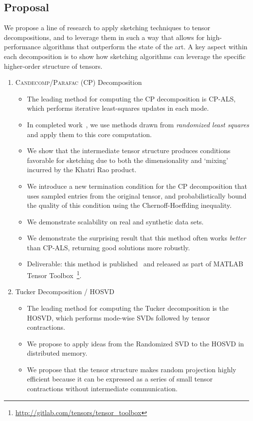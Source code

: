 \subsection{Proposal}
We propose a line of research to apply sketching techniques to tensor decompositions, and to leverage them in such a way that allows for high-performance algorithms that outperform the state of the art. A key aspect within each decomposition is to show how sketching algorithms can leverage the specific higher-order structure of tensors.
\begin{enumerate}
\item \textsc{Candecomp/Parafac} (CP) Decomposition
\begin{itemize}
	\item The leading method for computing the CP decomposition is CP-ALS, which performs iterative least-squares updates in each mode.
	\item In completed work~\cite{caseyb}, we use methods drawn from \emph{randomized least squares} and apply them to this core computation.
	\item We show that the intermediate tensor structure produces conditions favorable for sketching due to both the dimensionality and `mixing' incurred by the Khatri Rao product.
	\item We introduce a new termination condition for the CP decomposition that uses sampled entries from the original tensor, and probabilistically bound the quality of this condition using the Chernoff-Hoeffding inequality. 
	\item We demonstrate scalability on real and synthetic data sets.
	\item We demonstrate the surprising result that this method often works \emph{better} than CP-ALS, returning good solutions more robustly.
	\item Deliverable: this method is published~\cite{caseyb} and released as part of MATLAB Tensor Toolbox~\cite{TTB_Software}\footnote{\url{http://gitlab.com/tensors/tensor_toolbox}}.
\end{itemize}
\item Tucker Decomposition / HOSVD
\begin{itemize}
	\item The leading method for computing the Tucker decomposition is the HOSVD, which performs mode-wise SVDs followed by tensor contractions.
	\item We propose to apply ideas from the Randomized SVD to the HOSVD in distributed memory.
	\item We propose that the tensor structure makes random projection highly efficient because it can be expressed as a series of small tensor contractions without intermediate communication. 

\end{itemize}
\end{enumerate}
